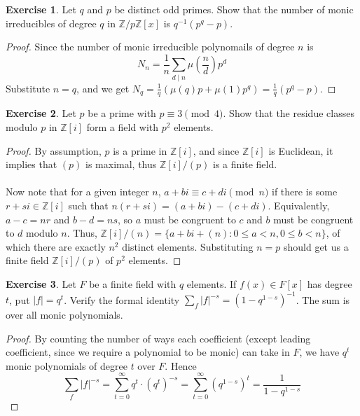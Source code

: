 \documentclass{article}
\theoremstyle{definition}
\newtheorem{exercise}{Exercise}
\begin{document}
\newpage

\begin{exercise}
Let $q$ and $p$ be distinct odd primes. Show that the number of monic irreducibles of degree $q$ in $\mathbb{Z}/p \mathbb{Z} [x]$ is $q^{-1} (p^q - p)$.
\end{exercise}
\begin{proof}
Since the number of monic irreducible polynomails of degree $n$ is
$$N_n = \frac{1}{n} \sum_{d \mid n} \mu \left( \frac{n}{d} \right) p^d$$
Substitute $n = q$, and we get $N_q  = \frac{1}{q} (\mu(q) p + \mu(1) p^q) = \frac{1}{q} (p^q - p)$.
\end{proof}

\newpage

\begin{exercise}
Let $p$ be a prime with $p \equiv 3 \pmod{4}$. Show that the residue classes modulo $p$ in $\mathbb{Z}[i]$ form a field with $p^2$ elements.
\end{exercise}
\begin{proof}
By assumption, $p$ is a prime in $\mathbb{Z}[i]$, and since $\mathbb{Z}[i]$ is Euclidean, it implies that $(p)$ is maximal, thus $\mathbb{Z}[i] / (p)$ is a finite field.
\\
\\
Now note that for a given integer $n$, $a + bi \equiv c + di \pmod{n}$ if there is some $r + si \in \mathbb{Z}[i]$ such that $n (r + si) = (a + bi) - (c + di)$. Equivalently, $a - c = nr$ and $b - d = ns$, so $a$ must be congruent to $c$ and $b$ must be congruent to $d$ modulo $n$. Thus, $\mathbb{Z}[i] / (n) = \{ a + bi + (n) : 0 \leq a < n, 0 \leq b < n \}$, of which there are exactly $n^2$ distinct elements. Substituting $n = p$ should get us a finite field $\mathbb{Z}[i] / (p)$ of $p^2$ elements.
\end{proof}

\newpage

\begin{exercise} \label{c7-ex-19}
Let $F$ be a finite field with $q$ elements. If $f(x) \in F[x]$ has degree $t$, put $|f| = q^t$. Verify the formal identity $\sum_f |f|^{-s} = (1 - q^{1 - s})^{-1}$. The sum is over all monic polynomials.
\end{exercise}
\begin{proof}
By counting the number of ways each coefficient (except leading coefficient, since we require a polynomial to be monic) can take in $F$, we have $q^t$ monic polynomials of degree $t$ over $F$. Hence
$$\sum_f |f|^{-s} = \sum_{t = 0}^\infty q^t \cdot (q^t)^{-s} = \sum_{t = 0}^\infty (q^{1 - s})^t = \frac{1}{1 - q^{1 - s}}$$
\end{proof}
\end{document}
